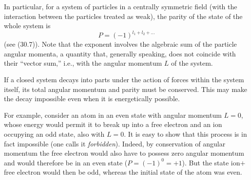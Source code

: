 In particular, for a system of particles in a centrally symmetric field
(with the interaction between the particles treated as weak), the parity of
the state of the whole system is
\begin{equation}
  P=(-1)^{l_1+l_2+\ldots}
  \tag{31.6}
\end{equation}
(see (30.7)). Note that the exponent involves the algebraic sum of the
particle angular momenta, a quantity that, generally speaking, does not
coincide with their “vector sum,” i.e., with the angular momentum $L$ of
the system.

If a closed system decays into parts under the action of forces within the
system itself, its total angular momentum and parity must be conserved. This
may make the decay impossible even when it is energetically possible.

For example, consider an atom in an even state with angular momentum $L=0$,
whose energy would permit it to break up into a free electron and an ion
occupying an odd state, also with $L=0$. It is easy to show that this
process is in fact impossible (one calls it \emph{forbidden}). Indeed, by
conservation of angular momentum the free electron would also have to possess
zero angular momentum and would therefore be in an even state
($P=(-1)^0=+1$). But the state ion$+$free electron would then be odd, whereas
the initial state of the atom was even.
